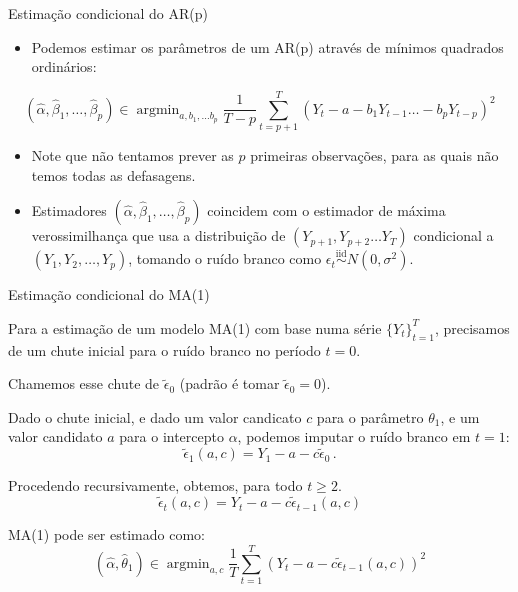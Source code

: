 \documentclass[11pt]{beamer}
\newenvironment{halfwideitemize}{\itemize\addtolength{\itemsep}{0.5em}}{\enditemize}
\begin{document}
\begin{frame}{Estimação condicional do AR(p)}
	\begin{itemize}
		\item Podemos estimar os parâmetros de um AR(p) através de mínimos quadrados ordinários:
	\end{itemize}
		\begin{equation*}
			(\hat\alpha,\hat{\beta}_1,\ldots, \hat\beta_p) \in \operatorname{argmin}_{a,b_1,\ldots b_p} \frac{1}{T-p}\sum_{t=p+1}^{T}(Y_{t}- a - b_1 Y_{t-1} \ldots - b_p Y_{t-p})^2
		\end{equation*}
				\begin{itemize}
		\item Note que não tentamos prever as $p$ primeiras observações, para as quais não temos todas as defasagens.
		\item Estimadores $	(\hat\alpha,\hat{\beta}_1,\ldots, \hat\beta_p) $ coincidem com o estimador de máxima verossimilhança que usa a distribuição de $(Y_{p+1},Y_{p+2}\ldots Y_{T})$ {\color{blue}condicional} a $(Y_1,Y_2,\ldots,Y_p)$, tomando o ruído branco como $\epsilon_{t}\overset{\text{iid}}{\sim} N(0,\sigma^2)$.
		 \end{itemize}
\end{frame}
\begin{frame}{Estimação condicional do MA(1)}
	\begin{halfwideitemize}
		\item Para a estimação de um modelo MA(1) com base numa série $\{Y_{t}\}_{t=1}^T$, precisamos de um chute inicial para o ruído branco no período $t=0$.
		\item Chamemos esse chute de $\tilde{\epsilon}_0$ (padrão é tomar  $\tilde{\epsilon}_0 = 0$).

		\item Dado o chute inicial, e dado um valor candicato $c$ para o parâmetro $\theta_1$, e um valor candidato $a$ para o intercepto $\alpha$, podemos imputar o ruído branco em $t=1$:
		$$ \tilde{\epsilon}_{1}(a,c) = Y_1 - a - c \tilde{\epsilon}_0 \, .$$
		\item Procedendo recursivamente, obtemos, para todo $t\geq 2$.
		$$ \tilde{\epsilon}_{t}(a,c) = Y_t - a - c \tilde{\epsilon}_{t-1}(a,c)$$
		\item MA(1) pode ser estimado como:
		\begin{equation*}
			(\hat \alpha, \hat \theta_1) \in \operatorname{argmin}_{a, c}\frac{1}{T}\sum_{t=1}^{T}(Y_t -a  - c\tilde{\epsilon}_{t-1}(a,c))^2
		\end{equation*}
	\end{halfwideitemize}
\end{frame}
\end{document}
